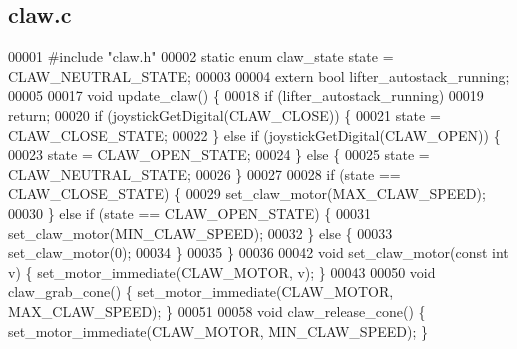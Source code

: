 \subsection{claw.\+c}
\label{claw_8c_source}

\begin{DoxyCode}
00001 \textcolor{preprocessor}{#include "claw.h"}
00002 \textcolor{keyword}{static} \textcolor{keyword}{enum} claw_state state = CLAW_NEUTRAL_STATE;
00003 
00004 \textcolor{keyword}{extern} \textcolor{keywordtype}{bool} lifter_autostack_running;
00005 
00017 \textcolor{keywordtype}{void} update_claw() \{
00018   \textcolor{keywordflow}{if} (lifter_autostack_running)
00019     \textcolor{keywordflow}{return};
00020   \textcolor{keywordflow}{if} (joystickGetDigital(CLAW\_CLOSE)) \{
00021     state = CLAW_CLOSE_STATE;
00022   \} \textcolor{keywordflow}{else} \textcolor{keywordflow}{if} (joystickGetDigital(CLAW\_OPEN)) \{
00023     state = CLAW_OPEN_STATE;
00024   \} \textcolor{keywordflow}{else} \{
00025     state = CLAW_NEUTRAL_STATE;
00026   \}
00027 
00028   \textcolor{keywordflow}{if} (state == CLAW_CLOSE_STATE) \{
00029     set_claw_motor(MAX\_CLAW\_SPEED);
00030   \} \textcolor{keywordflow}{else} \textcolor{keywordflow}{if} (state == CLAW_OPEN_STATE) \{
00031     set_claw_motor(MIN\_CLAW\_SPEED);
00032   \} \textcolor{keywordflow}{else} \{
00033     set_claw_motor(0);
00034   \}
00035 \}
00036 
00042 \textcolor{keywordtype}{void} set_claw_motor(\textcolor{keyword}{const} \textcolor{keywordtype}{int} v) \{ set_motor_immediate(CLAW\_MOTOR, v); \}
00043 
00050 \textcolor{keywordtype}{void} claw_grab_cone() \{ set_motor_immediate(CLAW\_MOTOR, MAX\_CLAW\_SPEED); \}
00051 
00058 \textcolor{keywordtype}{void} claw_release_cone() \{ set_motor_immediate(CLAW\_MOTOR, MIN\_CLAW\_SPEED); \}
\end{DoxyCode}
